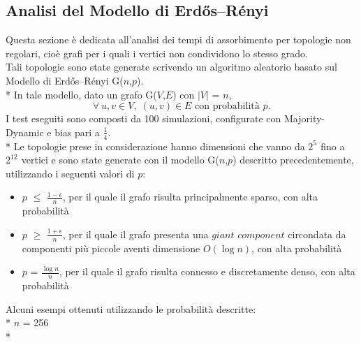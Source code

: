 \documentclass{article}
\begin{document}
\subsection{Analisi del Modello di Erdős–Rényi}
Questa sezione è dedicata all'analisi dei tempi di assorbimento per topologie non regolari, cioè grafi per i quali i vertici non condividono lo stesso grado.\\
Tali topologie sono state generate scrivendo un algoritmo aleatorio basato sul Modello di Erdős–Rényi G($n$,$p$).\\*
In tale modello, dato un grafo G($V$,$E$) con $|V|$ = $n$,
\begin{equation}
    \forall \: u,v \in V,\; (u,v) \in E  \text{ con probabilità } p.
\end{equation}
I test eseguiti sono composti da 100 simulazioni, configurate con Majority-Dynamic e bias pari a $\frac{1}{4}$.\\*
Le topologie prese in considerazione hanno dimensioni che vanno da $2^{5^{\mathrm{}}}$ fino a $2^{12^{\mathrm{}}}$ vertici e sono state generate con il modello G($n$,$p$) descritto precedentemente, utilizzando i seguenti valori di $p$:
\begin{itemize}
\item $p$ $\leq$ $\frac{1-\epsilon}{n}$, per il quale il grafo risulta principalmente sparso, con alta probabilità
\item $p$ $\geq$ $\frac{1+\epsilon}{n}$, per il quale il grafo presenta una $giant$ $component$ circondata da componenti più piccole aventi dimensione $O(\log{}n)$, con alta probabilità
\item $p$ = $\frac{\log{}n}{n}$, per il quale il grafo risulta connesso e discretamente denso, con alta probabilità
\end{itemize}
Alcuni esempi ottenuti utilizzando le probabilità descritte:\\*
$n$ = 256\\*
\end{document}
